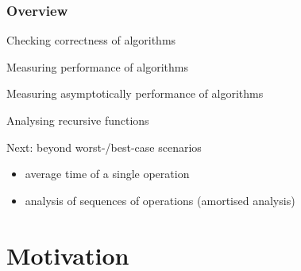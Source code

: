 \documentclass[aspectratio=169]{beamer}
\begin{document}
\frame[plain]{\titlepage}


\begin{frame}[t]\frametitle{Overview}


  \begin{itemize}
    {\color{black!25}
    \item Checking {correctness} of algorithms}
    \item Measuring  performance of algorithms
    \item Measuring \alert{asymptotically} performance of algorithms
    \item Analysing \alert{recursive} functions
    \item Next: beyond worst-/best-case scenarios
          \begin{itemize}
            \item \alert{average time} of a single operation
            \item analysis of sequences of operations (\alert{amortised analysis})
          \end{itemize}
    \end{itemize}
\end{frame}

\section{Motivation}

\end{document}
